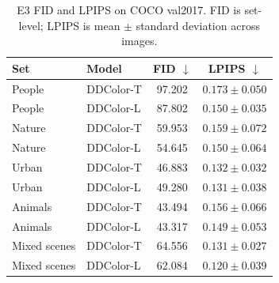 \documentclass{FastFyp}
\begin{document}
\begin{table}[htbp]
\centering
\caption{E3 FID and LPIPS on COCO val2017. FID is set-level; LPIPS is mean $\pm$ standard deviation across images.}
\label{tab:e3-fid-lpips}
\small
\begin{tabular}{llcc}
\hline
Set & Model & FID $\downarrow$ & LPIPS $\downarrow$\\
\hline
People & DDColor-T & 97.202 & $0.173\pm0.050$\\
People & DDColor-L & 87.802 & $0.150\pm0.035$\\
Nature & DDColor-T & 59.953 & $0.159\pm0.072$\\
Nature & DDColor-L & 54.645 & $0.150\pm0.064$\\
Urban & DDColor-T & 46.883 & $0.132\pm0.032$\\
Urban & DDColor-L & 49.280 & $0.131\pm0.038$\\
Animals & DDColor-T & 43.494 & $0.156\pm0.066$\\
Animals & DDColor-L & 43.317 & $0.149\pm0.053$\\
Mixed scenes & DDColor-T & 64.556 & $0.131\pm0.027$\\
Mixed scenes & DDColor-L & 62.084 & $0.120\pm0.039$\\
\hline
\end{tabular}
\end{table}
\end{document}
